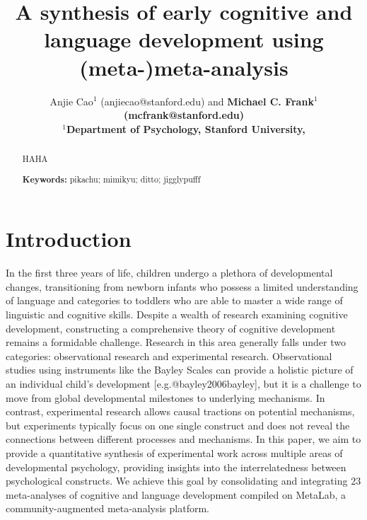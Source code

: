 \documentclass[10pt, letterpaper]{article}
\title{A synthesis of early cognitive and language development using
(meta-)meta-analysis}
\author{Anjie Cao$^1$  (anjiecao@stanford.edu)
 and \bf{Michael C. Frank$^1$ (mcfrank@stanford.edu)} \\
$^1$Department of Psychology, Stanford University, }
\begin{document}
\maketitle

\begin{abstract}
HAHA

\textbf{Keywords:}
pikachu; mimikyu; ditto; jigglypufff
\end{abstract}

\hypertarget{introduction}{%
\section{Introduction}\label{introduction}}

In the first three years of life, children undergo a plethora of
developmental changes, transitioning from newborn infants who possess a
limited understanding of language and categories to toddlers who are
able to master a wide range of linguistic and cognitive skills. Despite
a wealth of research examining cognitive development, constructing a
comprehensive theory of cognitive development remains a formidable
challenge. Research in this area generally falls under two categories:
observational research and experimental research. Observational studies
using instruments like the Bayley Scales can provide a holistic picture
of an individual child's development {[}e.g.@bayley2006bayley{]}, but it
is a challenge to move from global developmental milestones to
underlying mechanisms. In contrast, experimental research allows causal
tractions on potential mechanisms, but experiments typically focus on
one single construct and does not reveal the connections between
different processes and mechanisms. In this paper, we aim to provide a
quantitative synthesis of experimental work across multiple areas of
developmental psychology, providing insights into the interrelatedness
between psychological constructs. We achieve this goal by consolidating
and integrating 23 meta-analyses of cognitive and language development
compiled on MetaLab, a community-augmented meta-analysis platform.
\end{document}

